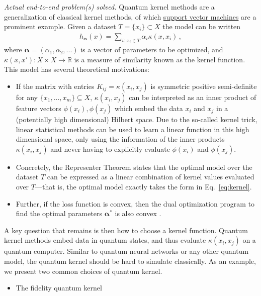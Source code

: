 \begin{refsection}
\textit{Actual end-to-end problem(s) solved.} Quantum kernel methods are a generalization of classical kernel methods, of which \hyperref[sec:SVM]{support vector machines} are a prominent example. Given a dataset $T=\{x_i\}\subset X$ the model can be written
\begin{align}\label{eq:kernel}
    h_{\boldsymbol{\alpha}}(x) = \sum_{i:\, x_i \in T} \alpha_i \kappa(x,x_i)\,,
\end{align}
where $\boldsymbol{\alpha}=(\alpha_1, \alpha_2, ...)$ is a vector of parameters to be optimized, and $\kappa(x,x'): X \times X \rightarrow \mathbb{R}$ is a measure of similarity known as the kernel function. 
This model has several theoretical motivations:
\begin{itemize}
    \item If the matrix with entries $K_{ij}=\kappa(x_i,x_j)$ is symmetric positive semi-definite for any $\{x_1,...,x_m\}\subseteq X$, $\kappa(x_i,x_j)$ can be interpreted as an inner product of feature vectors $\phi(x_i), \phi(x_j)$ which embed the data $x_i$ and $x_j$ in a (potentially high dimensional) Hilbert space. Due to the so-called kernel trick, linear statistical methods can be used to learn a linear function in this high dimensional space, only using the information of the inner products $\kappa(x_i,x_j)$ and never having to explicitly evaluate $\phi(x_i)$ and $\phi(x_j)$. 
    \item Concretely, the Representer Theorem \cite{scholkopf2001RepresenterThm} states that the optimal model over the dataset $T$ can be expressed as a linear combination of kernel values evaluated over $T$---that is, the optimal model exactly takes the form in Eq.~\eqref{eq:kernel}.
    \item Further, if the loss function is convex, then the dual optimization program to find the optimal parameters $\boldsymbol{\alpha}^*$ is also convex \cite{schuld2021kernelmethods}.
\end{itemize}
A key question that remains is then how to choose a kernel function. Quantum kernel methods embed data in quantum states, and thus evaluate $\kappa(x_i,x_j)$ on a quantum computer. Similar to quantum neural networks or any other quantum model, the quantum kernel should be hard to simulate classically. As an example, we present two common choices of quantum kernel.
\begin{itemize}
    \item The fidelity quantum kernel
    \begin{equation}\label{eq:fidelity-kernel}

\end{equation}
\end{itemize}
\end{refsection}
